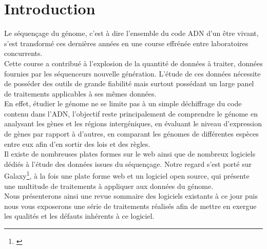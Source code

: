 \chapter*{Introduction}

Le séquençage du génome, c'est à dire l'ensemble du code ADN d'un être vivant, s'est transformé ces dernières années en une course effrénée entre laboratoires concurrents.\\

Cette course a contribué à l'explosion de la quantité de données à traiter, données fournies par les séquenceurs nouvelle génération. L'étude de ces données nécessite de posséder des outils de grande fiabilité mais surtout possédant un large panel de traitements applicables à ses mêmes données.\\

 En effet, étudier le génome ne se limite pas à un simple déchiffrage du code contenu dans l'ADN, l'objectif reste principalement de comprendre le génome en analysant les gènes et les régions intergéniques, en évaluant le niveau d'expression de gènes par rapport à d'autres, en comparant les génomes de différentes espèces entre eux afin d'en sortir des lois et des règles.\\
 
 Il existe de nombreuses plates formes sur le web ainsi que de nombreux logiciels dédiés à l'étude des données issues du séquençage. Notre regard s'est porté sur Galaxy\footnote{\cite{afgan2010galaxy}\cite{afgan2011harnessing}\cite{afganreference}\cite{afgan2011galaxy}\cite{blankenberg2011integrating}\cite{blankenberg2010manipulation}\cite{blankenberg2011making}\cite{blankenberg2007framework}\cite{bock2010web}\cite{giardine2005galaxy}\cite{goecks2011galaxy}\cite{lazarus2008toward}\cite{miller200728}\cite{pond2009windshield}\cite{schatz2010missing}}, à la fois une plate forme web et un logiciel open source, qui présente une multitude de traitements à appliquer aux données du génome.\\
 
 Nous présenterons ainsi une revue sommaire des logiciels existants à ce jour puis nous vous exposerons une série de traitements réalisés afin de mettre en exergue les qualités et les défauts inhérents à ce logiciel.
